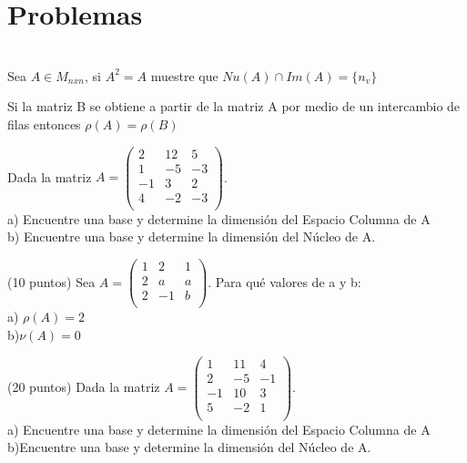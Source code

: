 \section{Problemas}
\begin{enumerate}
\begin{prop}[]

~\\Sea $A \in M_{nxn} $, si $A^2=A$ muestre que $Nu(A)\cap Im(A)=\{n_v\}$
\end{prop}

\begin{prop}

Si la matriz B se obtiene a partir de la matriz A por medio de un intercambio de filas entonces $\rho(A)=\rho(B)$
\end{prop}

\begin{prob}[]
Dada la matriz $A=\left(\begin{array}{rrr}
2&12&5\\
1&-5&-3\\
-1&3&2\\
4&-2&-3\\
\end{array}\right)$. ~\\
a) Encuentre una base y determine la dimensi\'on del Espacio Columna de A~\\
b) Encuentre una base y determine la dimensi\'on del N\'ucleo de A.
\end{prob}


\begin{prob}
(10 puntos) Sea $A=\left(\begin{matrix}
1&2&1\\
2&a&a\\
2&-1&b\\
\end{matrix}\right)$. Para qu\'e valores de a y b:~\\
a) $\rho(A)=2$~\\
b)$\nu(A)=0$ 
\end{prob}


\begin{prob}
(20 puntos) Dada la matriz $A=\left(\begin{array}{rrr}
1&11&4\\
2&-5&-1\\
-1&10&3\\
5&-2&1\\
\end{array}\right)$. ~\\
a) Encuentre una base y determine la dimensi\'on del Espacio Columna de A~\\
b)Encuentre una base y determine la dimensi\'on del N\'ucleo de A.
\end{prob}



\end{enumerate}